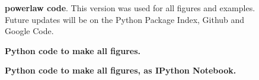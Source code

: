 \documentclass[10pt]{article}
\begin{document}
\begin{figure}%
\begin{center}
\end{center}
\caption{
{\bf powerlaw code}. This version was used for all figures and examples. Future updates will be on the Python Package Index, Github and Google Code.
}
\end{figure}

\begin{figure}%
\begin{center}
\end{center}
\caption{
{\bf Python code to make all figures.}
}
\end{figure}

\begin{figure}%
\begin{center}
\end{center}
\caption{
{\bf Python code to make all figures, as IPython Notebook.}
}
\end{figure}

 
\end{document}
